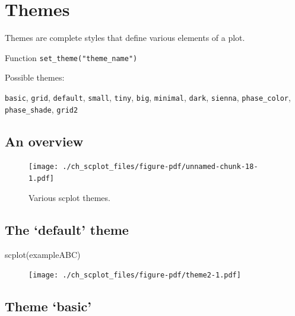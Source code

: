 \documentclass[
  letterpaper,
  DIV=11,
  numbers=noendperiod]{scrreprt}
\newenvironment{Shaded}{\begin{snugshade}}{\end{snugshade}}
\newcommand{\FunctionTok}[1]{\textcolor[rgb]{0.28,0.35,0.67}{#1}}
\newcommand{\NormalTok}[1]{\textcolor[rgb]{0.00,0.23,0.31}{#1}}
\begin{document}
\hypertarget{themes}{%
\section{Themes}\label{themes}}

Themes are complete styles that define various elements of a plot.

Function \texttt{set\_theme("theme\_name")}

Possible themes:

\texttt{basic}, \texttt{grid}, \texttt{default}, \texttt{small},
\texttt{tiny}, \texttt{big}, \texttt{minimal}, \texttt{dark},
\texttt{sienna}, \texttt{phase\_color}, \texttt{phase\_shade},
\texttt{grid2}

\hypertarget{an-overview}{%
\subsection{An overview}\label{an-overview}}

\begin{figure}

{\centering \texttt{[image: ./ch\_scplot\_files/figure-pdf/unnamed-chunk-18-1.pdf]}

}

\caption{Various scplot themes.}

\end{figure}

\hypertarget{the-default-theme}{%
\subsection{The `default' theme}\label{the-default-theme}}

\begin{Shaded}
\begin{Highlighting}[]
\FunctionTok{scplot}\NormalTok{(exampleABC)}
\end{Highlighting}
\end{Shaded}

\begin{figure}[H]

{\centering \texttt{[image: ./ch\_scplot\_files/figure-pdf/theme2-1.pdf]}

}

\end{figure}

\hypertarget{theme-basic}{%
\subsection{Theme `basic'}\label{theme-basic}}
\end{document}
